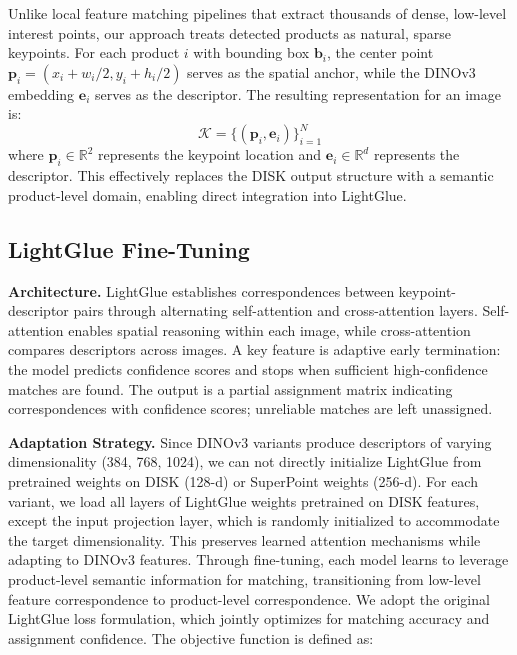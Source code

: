 \documentclass[10pt,twocolumn,letterpaper]{article}
\begin{document}
Unlike local feature matching pipelines that extract thousands of dense, low-level interest points, our approach treats detected products as natural, sparse keypoints. For each product $i$ with bounding box $\mathbf{b}_i$, the center point $\mathbf{p}_i = (x_i + w_i/2, y_i + h_i/2)$ serves as the spatial anchor, while the DINOv3 embedding $\mathbf{e}_i$ serves as the descriptor. The resulting representation for an image is:
\begin{equation}
\mathcal{K} = \{(\mathbf{p}_i, \mathbf{e}_i)\}_{i=1}^{N}
\end{equation}
where $\mathbf{p}_i \in \mathbb{R}^2$ represents the keypoint location and $\mathbf{e}_i \in \mathbb{R}^{d}$ represents the descriptor. This effectively replaces the DISK output structure with a semantic product-level domain, enabling direct integration into LightGlue.

\subsection{LightGlue Fine-Tuning}
\label{subsec:lightglue}

\noindent\textbf{Architecture.}
LightGlue \cite{lightglue} establishes correspondences between keypoint-descriptor pairs through alternating self-attention and cross-attention layers.
Self-attention enables spatial reasoning within each image, while cross-attention compares descriptors across images.
A key feature is adaptive early termination: the model predicts confidence scores and stops when sufficient high-confidence matches are found.
The output is a partial assignment matrix indicating correspondences with confidence scores; unreliable matches are left unassigned.

\noindent\textbf{Adaptation Strategy.}
Since DINOv3 variants produce descriptors of varying dimensionality (384, 768, 1024), we can not directly initialize LightGlue from pretrained weights on DISK (128-d) or SuperPoint weights (256-d).
For each variant, we load all layers of LightGlue weights pretrained on DISK features, except the input projection layer, which is randomly initialized to accommodate the target dimensionality.
This preserves learned attention mechanisms while adapting to DINOv3 features. Through fine-tuning, each model learns to leverage product-level semantic information for matching, transitioning from low-level feature correspondence to product-level correspondence.
We adopt the original LightGlue loss formulation, which jointly optimizes for matching accuracy and assignment confidence. The objective function is defined as:
\end{document}
